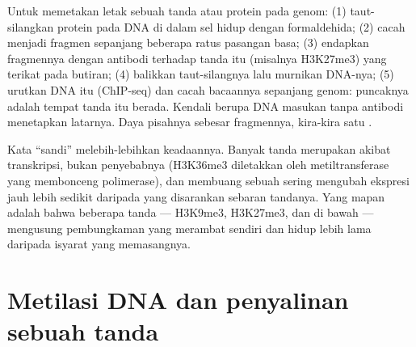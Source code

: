 \begin{method}\label{met:b3:chromatin-epigenetics:chip}
Untuk memetakan letak sebuah tanda atau protein pada genom: (1) taut-silangkan
protein pada DNA di dalam sel hidup dengan formaldehida; (2) cacah 
menjadi fragmen sepanjang beberapa ratus pasangan basa; (3) endapkan
fragmennya dengan antibodi terhadap tanda itu (misalnya H3K27me3) yang terikat
pada butiran; (4) balikkan taut-silangnya lalu murnikan DNA-nya; (5) urutkan
DNA itu (ChIP-seq) dan cacah bacaannya sepanjang genom: puncaknya adalah
tempat tanda itu berada. Kendali berupa DNA masukan tanpa antibodi menetapkan
latarnya. Daya pisahnya sebesar fragmennya, kira-kira satu .
\end{method}

\begin{remark}\label{rem:b3:chromatin-epigenetics:code}
Kata ``sandi'' melebih-lebihkan keadaannya. Banyak tanda merupakan akibat
transkripsi, bukan penyebabnya (H3K36me3 diletakkan oleh metiltransferase yang
membonceng polimerase), dan membuang sebuah  sering mengubah ekspresi
jauh lebih sedikit daripada yang disarankan sebaran tandanya. Yang mapan
adalah bahwa beberapa tanda --- H3K9me3, H3K27me3, dan  di
bawah --- mengusung pembungkaman yang merambat sendiri dan hidup lebih lama
daripada isyarat yang memasangnya.
\end{remark}

\section{Metilasi DNA dan penyalinan sebuah tanda}

